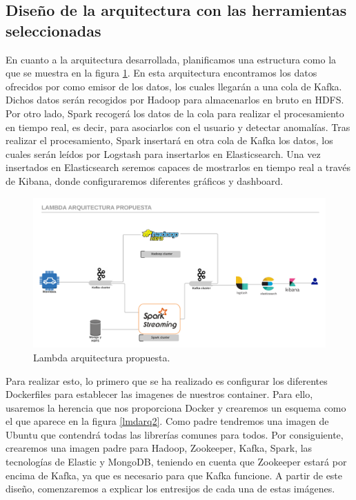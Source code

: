 \subsection{Diseño de la arquitectura con las herramientas seleccionadas\label{disenio}}

En cuanto a la arquitectura desarrollada, planificamos una estructura como la que se muestra en la figura \ref{lmdarq1}. En esta arquitectura encontramos los datos ofrecidos por \mdata{} como emisor de los datos, los cuales llegarán a una cola de Kafka. Dichos datos serán recogidos por Hadoop para almacenarlos en bruto en HDFS. Por otro lado, Spark recogerá los datos de la cola para realizar el procesamiento en tiempo real, es decir, para asociarlos con el usuario y detectar anomalías. Tras realizar el procesamiento, Spark insertará en otra cola de Kafka los datos, los cuales serán leídos por Logstash para insertarlos en Elasticsearch. Una vez insertados en Elasticsearch seremos capaces de mostrarlos en tiempo real a través de Kibana, donde configuraremos diferentes gráficos y dashboard.

\begin{figure}[htp]
\centering
\includegraphics[scale=0.26]{Imagenes/arqProp1.png}
\caption{Lambda arquitectura propuesta.}
\label{lmdarq1}
\end{figure}

Para realizar esto, lo primero que se ha realizado es configurar los diferentes Dockerfiles para establecer las imagenes de nuestros container. Para ello, usaremos la herencia que nos proporciona Docker y crearemos un esquema como el que aparece en la figura \ref{lmdarq2}. Como padre tendremos una imagen de Ubuntu que contendrá todas las librerías comunes para todos. Por consiguiente, crearemos una imagen padre para Hadoop, Zookeeper, Kafka, Spark, las tecnologías de Elastic y MongoDB, teniendo en cuenta que Zookeeper estará por encima de Kafka, ya que es necesario para que Kafka funcione. A partir de este diseño, comenzaremos a explicar los entresijos de cada una de estas imágenes.

